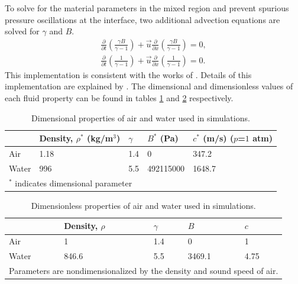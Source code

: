 To solve for
the material parameters in the mixed region and prevent spurious
pressure oscillations at the interface, two additional advection
equations are solved for $\gamma$ and $B$.
\begin{subequations} \label{usbe_lung_eosvar_advection}%
\begin{align}%
\frac{\partial}{\partial t}\left(\frac{\gamma B}{\gamma-1}\right)+\vec{u}\frac{\partial}{\partial x}\left(\frac{\gamma B}{\gamma-1}\right) = 0,\\
\frac{\partial}{\partial t}\left(\frac{1}{\gamma-1}\right)+\vec{u}\frac{\partial}{\partial x}\left(\frac{1}{\gamma-1}\right) = 0. 
\end{align}%
\end{subequations}%
This implementation is consistent with the works of \cite{Abgrall1996,
  Shyue2001, Beig2015}. Details of this implementation are explained
by \cite{HenrydeFrahan2015}.
%
The dimensional and dimensionless values of each fluid property can be
found in tables \ref{tab:usbe_lung_dimensional_parameters} and
\ref{tab:usbe_lung_dimensionless_parameters} respectively.
% 
\begin{table}[bp]%
  \begin{center}
    \caption{Dimensional properties of air and water used in simulations.}
    \label{tab:usbe_lung_dimensional_parameters}%
    \begin{tabularx}{0.75\textwidth}{| X | X | X | X | X |}
      \hline
      & Density, $\rho^*$ (kg/m$^3$) & $\gamma$ & $B^*$ (Pa)  & $c^*$ (m/s) ($p$=$1$ atm) \\ \hline
      Air   & 1.18                        & 1.4      & 0         & 347.2     \\ \hline
      Water & 996                           & 5.5      & 492115000 & 1648.7     \\ \hline
      \multicolumn{5}{l}{\small $^*$ indicates dimensional parameter}
    \end{tabularx}
  \end{center}
\end{table}%
\begin{table}[bp]%
  \begin{center}
    \caption{Dimensionless properties of air and water used in simulations.}
    \label{tab:usbe_lung_dimensionless_parameters}%
    \begin{tabularx}{0.75\textwidth}{| X | X | X | X | X |}
      \hline
      & Density, $\rho$ & $\gamma$ & $B$ & $c$ \\ \hline
      Air   & 1                          & 1.4      & 0         & 1          \\ \hline
      Water & 846.6                      & 5.5      & 3469.1    & 4.75       \\ \hline
      \multicolumn{5}{l}{\small Parameters are nondimensionalized by the density and sound speed of air. }
    \end{tabularx}
  \end{center}
\end{table}
%
